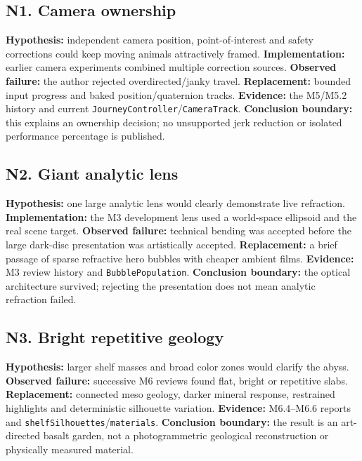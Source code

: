 \documentclass[
  english,
  11pt,
]{article}
\begin{document}
\subsection{N1. Camera ownership}\label{n1.-camera-ownership}

\textbf{Hypothesis:} independent camera position, point-of-interest and
safety corrections could keep moving animals attractively framed.
\textbf{Implementation:} earlier camera experiments combined multiple
correction sources. \textbf{Observed failure:} the author rejected
overdirected/janky travel. \textbf{Replacement:} bounded input progress
and baked position/quaternion tracks. \textbf{Evidence:} the M5/M5.2
history and current \texttt{JourneyController}/\texttt{CameraTrack}.
\textbf{Conclusion boundary:} this explains an ownership decision; no
unsupported jerk reduction or isolated performance percentage is
published.

\subsection{N2. Giant analytic lens}\label{n2.-giant-analytic-lens}

\textbf{Hypothesis:} one large analytic lens would clearly demonstrate
live refraction. \textbf{Implementation:} the M3 development lens used a
world-space ellipsoid and the real scene target. \textbf{Observed
failure:} technical bending was accepted before the large dark-disc
presentation was artistically accepted. \textbf{Replacement:} a brief
passage of sparse refractive hero bubbles with cheaper ambient films.
\textbf{Evidence:} M3 review history and \texttt{BubblePopulation}.
\textbf{Conclusion boundary:} the optical architecture survived;
rejecting the presentation does not mean analytic refraction failed.

\subsection{N3. Bright repetitive
geology}\label{n3.-bright-repetitive-geology}

\textbf{Hypothesis:} larger shelf masses and broad color zones would
clarify the abyss. \textbf{Observed failure:} successive M6 reviews
found flat, bright or repetitive slabs. \textbf{Replacement:} connected
meso geology, darker mineral response, restrained highlights and
deterministic silhouette variation. \textbf{Evidence:} M6.4--M6.6
reports and \texttt{shelfSilhouettes}/\texttt{materials}.
\textbf{Conclusion boundary:} the result is an art-directed basalt
garden, not a photogrammetric geological reconstruction or physically
measured material.
\end{document}
